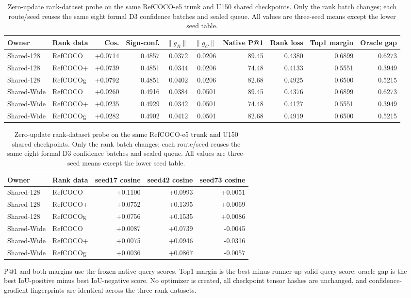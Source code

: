 \begin{table}[t]
\centering
\caption{Zero-update rank-dataset probe on the same RefCOCO-e5 trunk and U150
shared checkpoints.  Only the rank batch changes; each route/seed reuses the
same eight formal D3 confidence batches and sealed queue.  All values are
three-seed means except the lower seed table.}
\label{tab:supp-cross-dataset-probe}
\scriptsize
\setlength{\tabcolsep}{2.6pt}
\begin{tabular}{llrrrrrrrr}
\toprule
Owner & Rank data & Cos. & Sign-conf. & $\lVert g_R\rVert$ & $\lVert g_C\rVert$ & Native P@1 & Rank loss & Top1 margin & Oracle gap\\
\midrule
Shared-128 & RefCOCO & +0.0714 & 0.4857 & 0.0372 & 0.0206 & 89.45 & 0.4380 & 0.6899 & 0.6273 \\
Shared-128 & RefCOCO+ & +0.0739 & 0.4851 & 0.0344 & 0.0206 & 74.48 & 0.4133 & 0.5551 & 0.3949 \\
Shared-128 & RefCOCOg & +0.0792 & 0.4851 & 0.0402 & 0.0206 & 82.68 & 0.4925 & 0.6500 & 0.5215 \\
Shared-Wide & RefCOCO & +0.0260 & 0.4916 & 0.0384 & 0.0501 & 89.45 & 0.4376 & 0.6899 & 0.6273 \\
Shared-Wide & RefCOCO+ & +0.0235 & 0.4929 & 0.0342 & 0.0501 & 74.48 & 0.4127 & 0.5551 & 0.3949 \\
Shared-Wide & RefCOCOg & +0.0282 & 0.4902 & 0.0412 & 0.0501 & 82.68 & 0.4919 & 0.6500 & 0.5215 \\
\bottomrule
\end{tabular}
\par\smallskip
\begin{tabular}{llrrr}
\toprule
Owner & Rank data & seed17 cosine & seed42 cosine & seed73 cosine\\
\midrule
Shared-128 & RefCOCO & +0.1100 & +0.0993 & +0.0051 \\
Shared-128 & RefCOCO+ & +0.0752 & +0.1395 & +0.0069 \\
Shared-128 & RefCOCOg & +0.0756 & +0.1535 & +0.0086 \\
Shared-Wide & RefCOCO & +0.0087 & +0.0739 & -0.0045 \\
Shared-Wide & RefCOCO+ & +0.0075 & +0.0946 & -0.0316 \\
Shared-Wide & RefCOCOg & +0.0036 & +0.0867 & -0.0057 \\
\bottomrule
\end{tabular}
\parbox{0.98\textwidth}{\scriptsize P@1 and both margins use the frozen native
query scores. Top1 margin is the best-minus-runner-up valid-query score;
oracle gap is the best IoU-positive minus best IoU-negative score. No optimizer
is created, all checkpoint tensor hashes are unchanged, and confidence-gradient
fingerprints are identical across the three rank datasets.}
\end{table}
